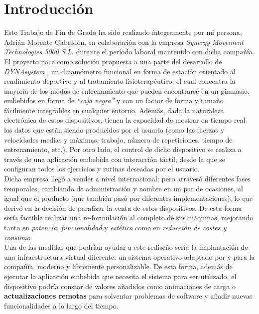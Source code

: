 \chapter{Introducción}

Este Trabajo de Fin de Grado ha sido realizado íntegramente por mi persona, Adrián Morente Gabaldón, en colaboración con la empresa \textit{Synergy Movement Technologies 3000 S.L.} durante el período laboral mantenido con dicha compañía. El proyecto nace como solución propuesta a una parte del desarrollo de \textit{DYNAsystem} \cite{dynasystem-web}, un dinamómetro funcional en forma de estación orientado al rendimiento deportivo y al tratamiento fisioterapéutico, el cual concentra la mayoría de los modos de entrenamiento que pueden encontrarse en un gimnasio, embebidos en forma de \textit{``caja negra''} y con un factor de forma y tamaño fácilmente integrables en cualquier entorno. Además, dada la naturaleza electrónica de estos dispositivos, tienen la capacidad de mostrar en tiempo real los datos que están siendo producidos por el usuario (como las fuerzas y velocidades medias y máximas, trabajo, número de repeticiones, tiempo de entrenamiento, etc.). Por otro lado, el control de dicho dispositivo se realiza a través de una aplicación embebida con interacción táctil, desde la que se configuran todos los ejercicios y rutinas deseadas por el usuario.\\

Dicha empresa llegó a vender a nivel internacional; pero atravesó diferentes fases temporales, cambiando de administración y nombre en un par de ocasiones, al igual que el producto (que también pasó por diferentes implementaciones), lo que derivó en la decisión de paralizar la venta de estos dispositivos. De esta forma sería factible realizar una re-formulación al completo de sus máquinas, mejorando tanto en \textit{potencia}, \textit{funcionalidad} y \textit{estética} como en \textit{reducción de costes y consumo}.\\

Una de las medidas que podrían ayudar a este rediseño sería la implantación de una infraestructura virtual diferente: un sistema operativo adaptado por y para la compañía, moderno y libremente personalizable. De esta forma, además de ejecutar la aplicación embebida que necesita el sistema para ser utilizado, el dispositivo podría constar de valores añadidos como animaciones de carga o \textbf{actualizaciones remotas} para solventar problemas de software y añadir nuevas funcionalidades a lo largo del tiempo.\\

